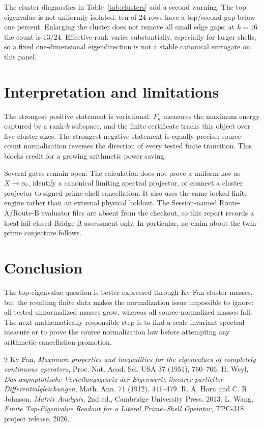 \documentclass[10pt]{article}
\begin{document}
The cluster diagnostics in Table~\ref{tab:clusters} add a second warning.  The
top eigenvalue is not uniformly isolated: ten of 24 rows have a top/second
gap below one percent.  Enlarging the cluster does not remove all small edge
gaps; at $k=16$ the count is 13/24.  Effective rank varies substantially,
especially for larger shells, so a fixed one-dimensional eigendirection is
not a stable canonical surrogate on this panel.

\section{Interpretation and limitations}

The strongest positive statement is variational: $F_k$ measures the maximum
energy captured by a rank-$k$ subspace, and the finite certificate tracks this
object over five cluster sizes.  The strongest negative statement is equally
precise: source-count normalization reverses the direction of every tested
finite transition.  This blocks credit for a growing arithmetic power saving.

Several gates remain open.  The calculation does not prove a uniform law as
$X\to\infty$, identify a canonical limiting spectral projector, or connect a
cluster projector to signed prime-shell cancellation.  It also uses the same
locked finite engine rather than an external physical holdout.  The
Session-named Route-A/Route-B evaluator files are absent from the checkout, so
this report records a local fail-closed Bridge-B assessment only.  In
particular, no claim about the twin-prime conjecture follows.

\section{Conclusion}

The top-eigenvalue question is better expressed through Ky Fan cluster masses,
but the resulting finite data makes the normalization issue impossible to
ignore: all tested unnormalized masses grow, whereas all source-normalized
masses fall.  The next mathematically responsible step is to find a
scale-invariant spectral measure or to prove the source normalization law
before attempting any arithmetic cancellation promotion.

\begin{thebibliography}{9}
Ky Fan, \emph{Maximum properties and inequalities for the eigenvalues of completely
continuous operators}, Proc. Nat. Acad. Sci. USA 37 (1951), 760--766.
H. Weyl, \emph{Das asymptotische Verteilungsgesetz der Eigenwerte linearer partieller
Differentialgleichungen}, Math. Ann. 71 (1912), 441--479.
R. A. Horn and C. R. Johnson, \emph{Matrix Analysis}, 2nd ed., Cambridge University
Press, 2013.
L. Wang, \emph{Finite Top-Eigenvalue Readout for a Literal Prime--Shell Operator},
TPC-318 project release, 2026.
\end{thebibliography}
\end{document}
